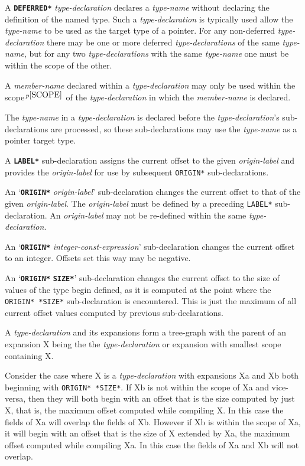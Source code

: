 \documentclass[12pt]{article}
\newcommand{\ttkey}[1]{{\tt \bfseries #1}}
\newcommand{\pagnote}[1]{$\,^{p\pageref{#1}}$}
\begin{document}
A \ttkey{*DEFERRED*} {\em type-declaration} declares a {\em type-name}
without declaring the definition of the named type.
Such a {\em type-declaration} is typically used allow the {\em type-name}
to be used as the target type of a pointer.
For any non-deferred {\em type-declaration} there may be one or more
deferred {\em type-declarations} of the same {\em type-name}, but for
any two {\em type-declarations} with the same {\em type-name}
one must be within the scope of the other.

A {\em member-name} declared within a {\em type-declaration} may
only be used within the scope\pagnote{SCOPE} of the {\em type-declaration}
in which the {\em member-name} is declared.

The {\em type-name} in a {\em type-declaration} is declared before
the {\em type-declaration}'s sub-declarations are processed, so these
sub-declarations may use the {\em type-name} as a pointer target type.

A \ttkey{*LABEL*} sub-declaration assigns the current offset to the
given {\em origin-label} and provides the {\em origin-label}
for use by subsequent {\tt *ORIGIN*} sub-declarations.

An `\ttkey{*ORIGIN*} {\em origin-label}' sub-declaration
changes the current offset to that
of the given {\em origin-label}.
The {\em origin-label} must be defined by a preceding
{\tt *LABEL*} sub-declaration.
An {\em origin-label} may not be re-defined within the same
{\em type-declaration}.

An `\ttkey{*ORIGIN*} {\em integer-const-expression}' sub-declaration
changes the current offset to an integer.  Offsets set this way
may be negative.

An `\ttkey{*ORIGIN*} \ttkey{*SIZE*}' sub-declaration
changes the current offset to the size of values of the type
begin defined, as it is computed at the point where the {\tt *ORIGIN* *SIZE*}
sub-declaration is encountered.  This is just the maximum of all
current offset values computed by previous sub-declarations.

A {\em type-declaration} and its expansions form a tree-graph
with the parent of an expansion X being the the {\em type-declaration}
or expansion with smallest scope containing X.

Consider the case where X is a {\em type-declaration} with expansions
Xa and Xb both beginning with {\tt *ORIGIN* *SIZE*}.  If Xb is not
within the scope of Xa and vice-versa, then they will both begin
with an offset that is the size computed by just X, that is, the maximum
offset computed while compiling X.  In this case the fields of Xa will
overlap the fields of Xb.  However if
Xb is within the scope of Xa, it will begin with an offset that
is the size of X extended by Xa, the maximum offset computed while
compiling Xa.  In this case the fields of Xa and Xb will not overlap.
\end{document}
